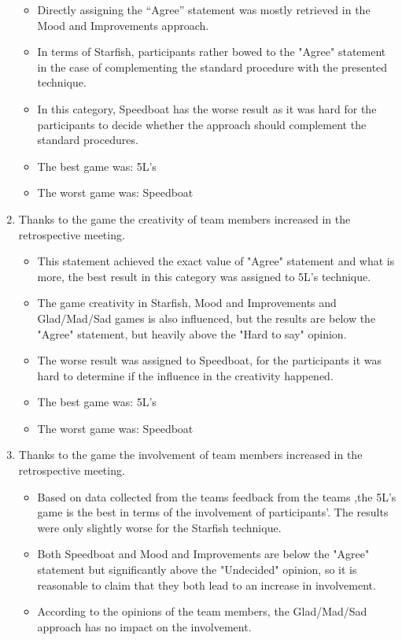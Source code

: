 \begin{enumerate}
\begin{itemize}
        \item Directly assigning the “Agree” statement was mostly retrieved in the Mood and Improvements approach.
        \item In terms of Starfish, participants rather bowed to the "Agree" statement in the case of complementing the standard procedure with the presented technique.
        \item In this category, Speedboat has the worse result as it was hard for the participants to decide whether the approach should complement the standard procedures.
        \item The best game was: 5L's
        \item The worst game was: Speedboat
    \end{itemize}
    \item Thanks to the game the creativity of team members increased in the retrospective meeting.
    \begin{itemize}
        \item This statement achieved the exact value of "Agree" statement and what is more, the best result in this category was assigned to 5L's technique.
        \item The game creativity in Starfish, Mood and Improvements and Glad/Mad/Sad games is also influenced, but the results are below the "Agree" statement, but heavily above the "Hard to say" opinion.
        \item The worse result was assigned to Speedboat, for the participants it was hard to determine if the influence in the creativity happened. 
        \item The best game was: 5L's
        \item The worst game was: Speedboat
    \end{itemize}
    \item Thanks to the game the involvement of team members increased in the retrospective meeting.
    \begin{itemize}
        \item Based on data collected from the teams feedback from the teams ,the 5L’s game is the best in terms of the involvement of participants'. The results were only slightly worse for the Starfish technique. 
        \item Both Speedboat and Mood and Improvements are below the "Agree" statement but significantly above the "Undecided" opinion, so it is reasonable to claim that they both lead to an increase in involvement.
        \item According to the opinions of the team members, the Glad/Mad/Sad approach has no impact on the involvement.

\end{itemize}
\end{enumerate}
